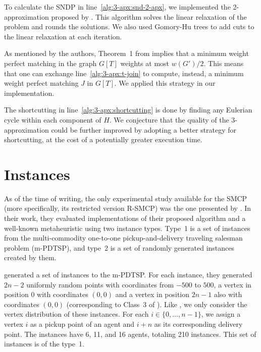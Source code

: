 
To calculate the SNDP in line~\eqref{alg:3-apx:snd-2-apx}, we implemented the 2-approximation proposed by \cite{snd-2-apx}. This algorithm solves the linear relaxation of the problem and rounds the solutions. We also used Gomory-Hu trees to add cuts to the linear relaxation at each iteration.

As mentioned by the authors, Theorem~1 from \cite{smcp_3apx} implies that a minimum weight perfect matching in the graph \(G[T]\) weights at most \(w(G')/2\). This means that one can exchange line~\eqref{alg:3-apx:t-join} to compute, instead, a minimum weight perfect matching \(J\) in \(G[T]\). We applied this strategy in our implementation.

The shortcutting in line~\eqref{alg:3-apx:shortcutting} is done by finding any Eulerian cycle within each component of \(H\). We conjecture that the quality of the 3-approximation could be further improved by adopting a better strategy for shortcutting, at the cost of a potentially greater execution time.

\section{Instances}

As of the time of writing, the only experimental study available for the SMCP (more specifically, its restricted version R-SMCP) was the one presented by \cite{Pereira2018TheSM}. In their work, they evaluated implementations of their proposed algorithm and a well-known metaheuristic using two instance types. Type~1 is a set of instances from the multi-commodity one-to-one pickup-and-delivery traveling salesman problem (m-PDTSP), and type~2 is a set of randomly generated instances created by them.

\cite{HERNANDEZPEREZ2009987} generated a set of instances to the m-PDTSP. For each instance, they generated \(2n - 2\) uniformly random points with coordinates from \(-500\) to \(500\), a vertex in position \(0\) with coordinates \((0, 0)\) and a vertex in position \(2n - 1\) also with coordinates \((0, 0)\) (corresponding to Class~3 of \cite{HERNANDEZPEREZ2009987}). Like \cite{Pereira2018TheSM}, we only consider the vertex distribution of these instances. For each \(i \in \{0, \dots, n - 1\}\), we assign a vertex \(i\) as a pickup point of an agent and \(i + n\) as its corresponding delivery point. The instances have 6, 11, and 16 agents, totaling 210 instances. This set of instances is of the type~1.

